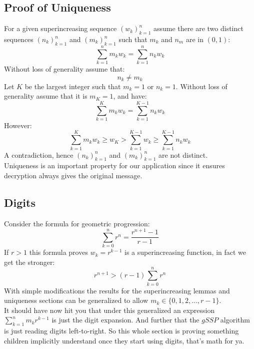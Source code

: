 \subsection{Proof of Uniqueness}
For a given superincreasing sequence $(w_k)_{k=1}^n$ assume there are two distinct sequences $(n_k)_{k=1}^n$ and $(m_k)_{k=1}^n$ such that $m_k$ and $n_m$ are in $(0,1)$:
\[\sum_{k=1}^nm_kw_k = 	\sum_{k=1}^nn_kw_k\]
Without loss of generality assume that:
\[n_k \neq m_k\]
Let $K$ be the largest integer such that $m_k = 1$ or $n_k = 1$.
Without loss of generality assume that it is $m_K = 1$,
and have:
\[\sum_{k=1}^Km_kw_k = 	\sum_{k=1}^{K-1}n_kw_k\]
However:
\[\sum_{k=1}^Km_kw_k \geq w_K > \sum_{k=1}^{K-1}w_k \geq \sum_{k=1}^{K-1}n_kw_k\]
A contradiction,
hence $(n_k)_{k=1}^n$ and $(m_k)_{k=1}^n$ are not distinct.
\\

Uniqueness is an important property for our application since it ensures decryption always gives the original message.

\subsection{Digits}
Consider the formula for geometric progression:
\[\sum_{k=0}^nr^n = \frac{r^{n+1}-1}{r-1}\]
If $r>1$ this formula proves $w_k = r^{k-1}$ is a superincreasing function,
in fact we get the stronger:
\[r^{n+1} > (r-1)\sum_{k=0}^nr^n\]
With simple modifications the results for the superincreasing lemmas and uniqueness sections can be generalized to allow $m_k\in \{0,1,2,...,r-1\}$.
\\

It should have now hit you that under this generalized an expression $\sum_{k=1}^nm_kr^{k-1}$ is just the digit expansion.
And further that the $gSSP$ algorithm is just reading digits left-to-right.
So this whole section is proving something children implicitly understand once they start using digits,
that's math for ya.
